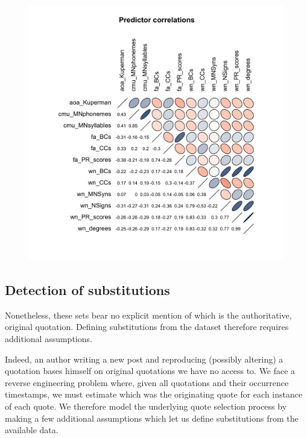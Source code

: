 \begin{figure}[!th]
\includegraphics[width=\linewidth]{algorithms/Rplot.pdf}
\end{figure}

\subsection{Detection of substitutions}

Nonetheless, these sets bear no explicit mention of which is the authoritative, original quotation.  Defining substitutions from the dataset therefore requires additional assumptions.  

Indeed, an author writing a new post and reproducing (possibly altering) a quotation bases himself on original quotations we have no access to. We face a reverse engineering problem where, given all quotations and their occurrence timestamps, we must estimate which was the originating quote for each instance of each quote. We therefore model the underlying quote selection process by making a few additional assumptions which let us define substitutions from the available data.

